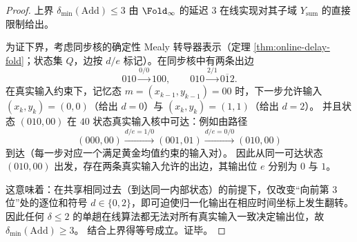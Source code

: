 \begin{proof}
上界 $\delta_{\min}(\mathrm{Add})\le 3$ 由 $\Fold_\infty$ 的延迟 $3$ 在线实现对其子域 $Y_{\mathrm{sum}}$ 的直接限制给出。

为证下界，考虑同步核的确定性 Mealy 转导器表示（定理 \ref{thm:online-delay-fold}；状态集 $Q$，边按 $d/e$ 标记）。在同步核中有两条出边
\[
010\xrightarrow{0/0}100,\qquad
010\xrightarrow{2/1}0\overline{1}2.
\]
在真实输入约束下，记忆态 $m=(x_{k-1},y_{k-1})=00$ 时，下一步允许输入 $(x_k,y_k)=(0,0)$（给出 $d=0$）与 $(x_k,y_k)=(1,1)$（给出 $d=2$）。
并且状态 $(010,00)$ 在 $40$ 状态真实输入核中可达：例如由路径
\[
(000,00)\xrightarrow{d/e=1/0}(001,01)\xrightarrow{d/e=0/0}(010,00)
\]
到达（每一步对应一个满足黄金均值约束的输入对）。
因此从同一可达状态 $(010,00)$ 出发，存在两条真实输入允许的出边，其输出位 $e$ 分别为 $0$ 与 $1$。

这意味着：在共享相同过去（到达同一内部状态）的前提下，仅改变“向前第 $3$ 位”处的逐位和符号 $d\in\{0,2\}$，即可迫使归一化输出在相应时间坐标上发生翻转。
因此任何 $\delta\le 2$ 的单趟在线算法都无法对所有真实输入一致决定输出位，故 $\delta_{\min}(\mathrm{Add})\ge 3$。
结合上界得等号成立。证毕。
\end{proof}

